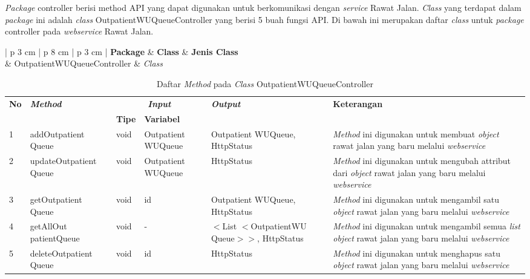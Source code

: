 \textit{Package} controller berisi method API yang dapat digunakan untuk berkomunikasi dengan \textit{service} Rawat Jalan. \textit{Class} yang terdapat dalam \textit{package} ini adalah \textit{class} OutpatientWUQueueController yang berisi 5 buah fungsi API. Di bawah ini merupakan daftar \textit{class} untuk \textit{package} controller pada \textit{webservice} Rawat Jalan.
\begin{table}[H]
	\small
	\centering
	\caption{Daftar {\itshape Class} pada {\itshape Package} Controller}
	\begin{adjustbox}{width=1\textwidth}
		\begin{tabular}{| p {3 cm} | p {8 cm} | p {3 cm} |}
			\hline
			{\bfseries Package} & {\bfseries Class} & {\bfseries Jenis Class} \\
			\hline
			 & OutpatientWUQueueController & {\itshape Class} \\
			\hline
		\end{tabular}
	\end{adjustbox}
\end{table}
\begin{table}[H]
	\caption{Daftar \textit{Method} pada \textit{Class} OutpatientWUQueueController}
	\centering
	\small
	\begin{adjustbox}{width=1\textwidth}	
		\begin{tabular}{|p{0.4cm}|p{2.8cm}|p{0.9cm}|p{1.8cm}|p{2.8cm}|p{2.5cm}|}
			\hline
			\multirow{2}{*}{\textbf{No}} & \multirow{2}{*}{\textit{\textbf{Method}}} & \multicolumn{2}{c|}{\textit{\textbf{Input}}} & \multirow{2}{*}{\textit{\textbf{Output}}} & 
			\multirow{2}{*}{\textbf{Keterangan}}\\
			\cline{3-4}
			& & \textbf{Tipe} & \textbf{Variabel} & & \\
			\hline
			1 & addOutpatient
			Queue & void & Outpatient
			WUQueue & Outpatient
			WUQueue, HttpStatus & \textit{Method} ini digunakan untuk membuat \textit{object} rawat jalan yang baru melalui \textit{webservice}\\
			\hline
			2 & updateOutpatient
			Queue & void & Outpatient
			WUQueue & HttpStatus & \textit{Method} ini digunakan untuk mengubah attribut dari \textit{object} rawat jalan yang baru melalui \textit{webservice}\\
			\hline
			3 & getOutpatient
			Queue & void & id & Outpatient
			WUQueue, HttpStatus & \textit{Method} ini digunakan untuk mengambil satu \textit{object} rawat jalan yang baru melalui \textit{webservice}\\
			\hline
			4 & getAllOut
			patientQueue & void & - & $<$List
			$<$OutpatientWU
			Queue$>$$>$, HttpStatus & \textit{Method} ini digunakan untuk mengambil semua \textit{list} \textit{object} rawat jalan yang baru melalui \textit{webservice}\\
			\hline
			5 & deleteOutpatient
			Queue & void & id & HttpStatus & \textit{Method} ini digunakan untuk menghapus satu \textit{object} rawat jalan yang baru melalui \textit{webservice}\\
			\hline
		\end{tabular}
	\end{adjustbox}
\end{table}
